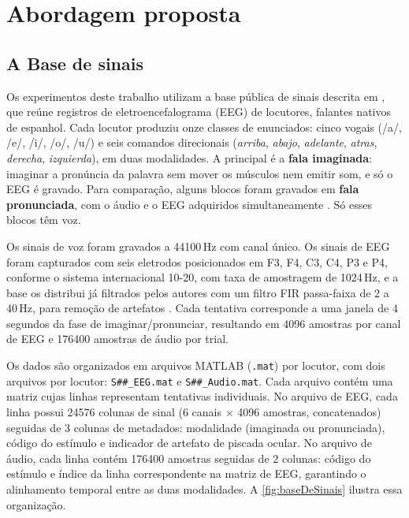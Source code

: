 \chapter{Abordagem proposta}
	\label{chap:propApproach}

	\section{A Base de sinais}
   		\label{sec:baseDeSinais}

		\par Os experimentos deste trabalho utilizam a base pública de sinais descrita em , que reúne registros de eletroencefalograma (EEG) de  locutores, falantes nativos de espanhol. Cada locutor produziu onze classes de enunciados: cinco vogais (/a/, /e/, /i/, /o/, /u/) e seis comandos direcionais (\textit{arriba}, \textit{abajo}, \textit{adelante}, \textit{atras}, \textit{derecha}, \textit{izquierda}), em duas modalidades. A principal é a \textbf{fala imaginada}: imaginar a pronúncia da palavra sem mover os músculos nem emitir som, e só o \ac{EEG} é gravado. Para comparação, alguns blocos foram gravados em \textbf{fala pronunciada}, com o áudio e o \ac{EEG} adquiridos simultaneamente \cite{10.1117/12.2255697}. Só esses blocos têm voz.

		\par Os sinais de voz foram gravados a 44100\,Hz com canal único. Os sinais de EEG foram capturados com seis eletrodos posicionados em F3, F4, C3, C4, P3 e P4, conforme o sistema internacional 10-20, com taxa de amostragem de 1024\,Hz, e a base os distribui já filtrados pelos autores com um filtro FIR passa-faixa de 2 a 40\,Hz, para remoção de artefatos \cite{10.1117/12.2255697}. Cada tentativa corresponde a uma janela de 4 segundos da fase de imaginar/pronunciar, resultando em 4096 amostras por canal de EEG e 176400 amostras de áudio por trial.

		\par Os dados são organizados em arquivos MATLAB (\texttt{.mat}) por locutor, com dois arquivos por locutor: \texttt{S\#\#\_EEG.mat} e \texttt{S\#\#\_Audio.mat}. Cada arquivo contém uma matriz cujas linhas representam tentativas individuais. No arquivo de EEG, cada linha possui 24576 colunas de sinal (6 canais $\times$ 4096 amostras, concatenados) seguidas de 3 colunas de metadados: modalidade (imaginada ou pronunciada), código do estímulo e indicador de artefato de piscada ocular. No arquivo de áudio, cada linha contém 176400 amostras seguidas de 2 colunas: código do estímulo e índice da linha correspondente na matriz de EEG, garantindo o alinhamento temporal entre as duas modalidades. A \autoref{fig:baseDeSinais} ilustra essa organização.

